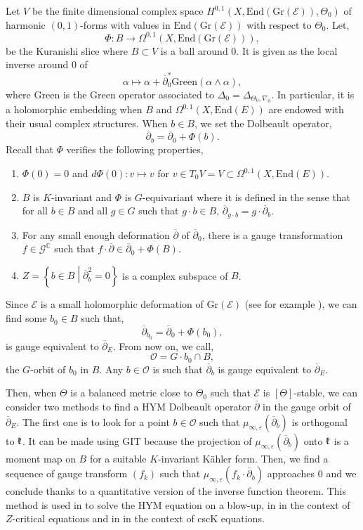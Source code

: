 \documentclass{article}
\theoremstyle{remark}
\theoremstyle{definition}
\newcommand{\C}{\mathbb{C}}
\newcommand{\End}{\mathrm{End}}
\newcommand{\E}{\mathcal{E}}
\newcommand{\G}{\mathcal{G}}
\newcommand{\Gr}{\mathrm{Gr}}
\newcommand{\dbar}{\overline{\partial}}
\begin{document}
Let $V$ be the finite dimensional complex space $H^{0,1}(X,\End(\Gr(\E)),\Theta_0)$ of harmonic $(0,1)$-forms with values in $\End(\Gr(\E))$ with respect to $\Theta_0$. Let,
$$
\Phi : B \rightarrow \Omega^{0,1}(X,\End(\Gr(\E))),
$$
be the Kuranishi slice \cite{Kuranishi} where $B \subset V$ is a ball around $0$. It is given as the local inverse around $0$ of
$$
\alpha \mapsto \alpha + \dbar_0^*\mathrm{Green}(\alpha \wedge \alpha),
$$
where $\mathrm{Green}$ is the Green operator associated to $\Delta_0 = \Delta_{\Theta_0,\nabla_0}$. In particular, it is a holomorphic embedding when $B$ and $\Omega^{0,1}(X,\End(E))$ are endowed with their usual complex structures. When $b \in B$, we set the Dolbeault operator,
$$
\dbar_b = \dbar_0 + \Phi(b).
$$
Recall that $\Phi$ verifies the following properties,
\begin{enumerate}
    \item $\Phi(0) = 0$ and $d\Phi(0) : v \mapsto v$ for $v \in T_0V = V \subset \Omega^{0,1}(X,\End(E))$.
    \item $B$ is $K$-invariant and $\Phi$ is $G$-equivariant where it is defined in the sense that for all $b \in B$ and all $g \in G$ such that $g \cdot b \in B$, $\dbar_{g \cdot b} = g \cdot \dbar_b$.
    \item For any small enough deformation $\dbar$ of $\dbar_0$, there is a gauge transformation $f \in \G^\C$ such that $f \cdot \dbar \in \dbar_0 + \Phi(B)$.
    \item $Z = \left\{b \in B\middle|\dbar_b^2 = 0\right\}$ is a complex subspace of $B$.
\end{enumerate}

Since $\E$ is a small holomorphic deformation of $\Gr(\E)$ (see for example \cite[Section 3]{Clarke_Tipler}), we can find some $b_0 \in B$ such that,
$$
\dbar_{b_0} = \dbar_0 + \Phi(b_0),
$$
is gauge equivalent to $\dbar_E$. From now on, we call,
$$
\mathcal{O} = G \cdot b_0 \cap B,
$$
the $G$-orbit of $b_0$ in $B$. Any $b \in \mathcal{O}$ is such that $\dbar_b$ is gauge equivalent to $\dbar_E$.

Then, when $\Theta$ is a balanced metric close to $\Theta_0$ such that $\E$ is $[\Theta]$-stable, we can consider two methods to find a HYM Dolbeault operator $\dbar$ in the gauge orbit of $\dbar_E$. The first one is to look for a point $b \in \mathcal{O}$ such that $\mu_{\infty,\varepsilon}(\dbar_b)$ is orthogonal to $\frak{k}$. It can be made using GIT because the projection of $\mu_{\infty,\varepsilon}(\dbar_b)$ onto $\frak{k}$ is a moment map on $B$ for a suitable $K$-invariant Kähler form. Then, we find a sequence of gauge transform $(f_k)$ such that $\mu_{\infty,\varepsilon}(f_k \cdot \dbar_b)$ approaches $0$ and we conclude thanks to a quantitative version of the inverse function theorem. This method is used in \cite{Sektnan_Tipler} to solve the HYM equation on a blow-up, in \cite{DMS} in the context of $Z$-critical equations and in \cite{Ortu_Sektnan} in the context of cscK equations.
\end{document}
